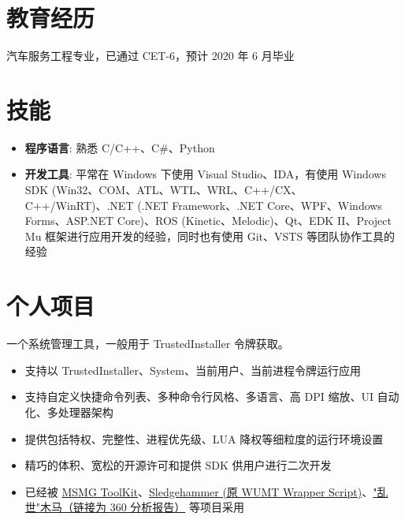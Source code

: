 \documentclass{resume}
\begin{document}
\renewcommand\headrulewidth{0pt}



\section{教育经历}

  汽车服务工程专业，已通过 CET-6，预计 2020 年 6 月毕业

\section{技能}
\begin{itemize}
  
  \item \textbf{程序语言}:
    熟悉 C/C++、C\#、Python
  
  \item \textbf{开发工具}:
    平常在 Windows 下使用 Visual Studio、IDA，有使用 Windows SDK (Win32、COM、ATL、WTL、WRL、C++/CX、C++/WinRT)、.NET (.NET Framework、.NET Core、WPF、Windows Forms、ASP.NET Core)、ROS (Kinetic、Melodic)、Qt、EDK II、Project Mu 框架进行应用开发的经验，同时也有使用 Git、VSTS 等团队协作工具的经验

\end{itemize}

\section{个人项目}

一个系统管理工具，一般用于 TrustedInstaller 令牌获取。
\begin{itemize}
  \item 支持以 TrustedInstaller、System、当前用户、当前进程令牌运行应用
  \item 支持自定义快捷命令列表、多种命令行风格、多语言、高 DPI 缩放、UI 自动化、多处理器架构
  \item 提供包括特权、完整性、进程优先级、LUA 降权等细粒度的运行环境设置
  \item 精巧的体积、宽松的开源许可和提供 SDK 供用户进行二次开发
  \item 已经被 \href{https://forums.mydigitallife.net/threads/50572/}{MSMG ToolKit}、\href{https://forums.mydigitallife.net/threads/72203/}{Sledgehammer (原 WUMT Wrapper Script)}、\href{http://www.360.cn/n/10477.html}{"乱世"木马（链接为 360 分析报告）} 等项目采用
\end{itemize}
\end{document}
